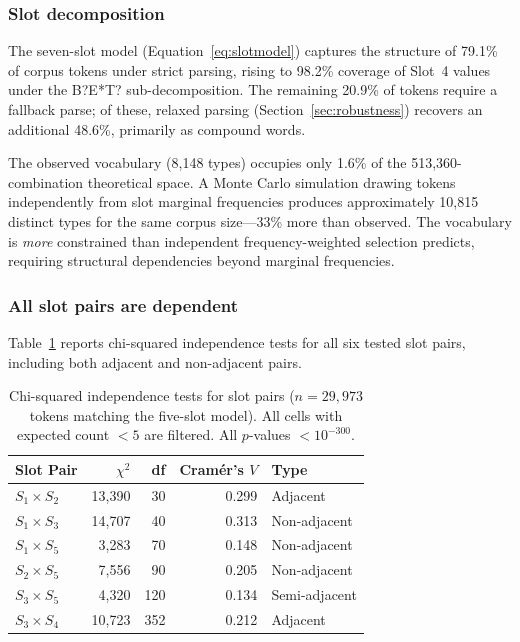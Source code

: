 \documentclass[12pt]{article}
\begin{document}
\subsubsection{Slot decomposition}

The seven-slot model (Equation~\ref{eq:slotmodel}) captures the structure of 79.1\% of corpus tokens under strict parsing, rising to 98.2\% coverage of Slot~4 values under the B?E*T? sub-decomposition. The remaining 20.9\% of tokens require a fallback parse; of these, relaxed parsing (Section~\ref{sec:robustness}) recovers an additional 48.6\%, primarily as compound words.

The observed vocabulary (8,148 types) occupies only 1.6\% of the 513,360-combination theoretical space. A Monte Carlo simulation drawing tokens independently from slot marginal frequencies produces approximately 10,815 distinct types for the same corpus size---33\% more than observed. The vocabulary is \emph{more} constrained than independent frequency-weighted selection predicts, requiring structural dependencies beyond marginal frequencies.

\subsubsection{All slot pairs are dependent}

Table~\ref{tab:chisq} reports chi-squared independence tests for all six tested slot pairs, including both adjacent and non-adjacent pairs.

\begin{table}[ht]
\centering
\caption{Chi-squared independence tests for slot pairs ($n = 29{,}973$ tokens matching the five-slot model). All cells with expected count $< 5$ are filtered. All $p$-values $< 10^{-300}$.}
\label{tab:chisq}
\begin{tabular}{lrrrl}
\toprule
Slot Pair & $\chi^2$ & df & Cram\'{e}r's $V$ & Type \\
\midrule
$S_1 \times S_2$ & 13{,}390 & 30 & 0.299 & Adjacent \\
$S_1 \times S_3$ & 14{,}707 & 40 & 0.313 & Non-adjacent \\
$S_1 \times S_5$ & 3{,}283 & 70 & 0.148 & Non-adjacent \\
$S_2 \times S_5$ & 7{,}556 & 90 & 0.205 & Non-adjacent \\
$S_3 \times S_5$ & 4{,}320 & 120 & 0.134 & Semi-adjacent \\
$S_3 \times S_4$ & 10{,}723 & 352 & 0.212 & Adjacent \\
\bottomrule
\end{tabular}
\end{table}
\end{document}
